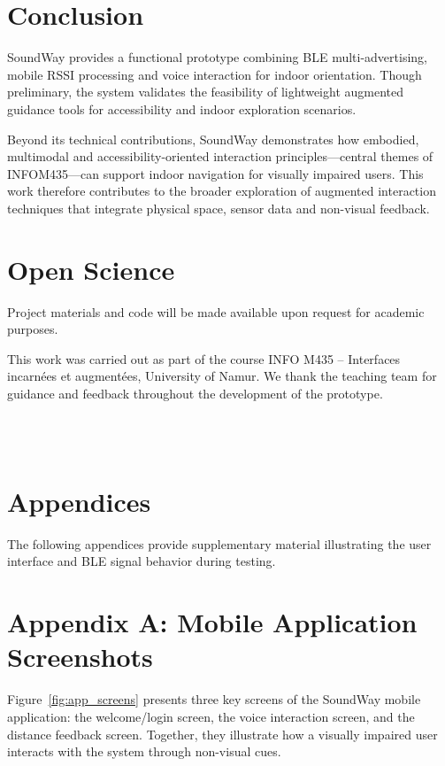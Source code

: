 \documentclass[sigconf]{acmart}
\begin{document}
\section{Conclusion}

SoundWay provides a functional prototype combining BLE multi-advertising, mobile RSSI processing and voice interaction for indoor orientation.  
Though preliminary, the system validates the feasibility of lightweight augmented guidance tools for accessibility and indoor exploration scenarios.

Beyond its technical contributions, SoundWay demonstrates how embodied, multimodal 
and accessibility-oriented interaction principles—central themes of INFOM435—can 
support indoor navigation for visually impaired users. This work therefore contributes 
to the broader exploration of augmented interaction techniques that integrate 
physical space, sensor data and non-visual feedback.


\section*{Open Science}
Project materials and code will be made available upon request for academic purposes.

\begin{acks}
This work was carried out as part of the course INFO M435 -- Interfaces incarnées et augmentées, University of Namur. We thank the teaching team for guidance and feedback throughout the development of the prototype.
\end{acks}
\\\\
\section*{Appendices}
The following appendices provide supplementary material illustrating the user interface and BLE signal behavior during testing.

\section*{Appendix A: Mobile Application Screenshots}

Figure~\ref{fig:app_screens} presents three key screens of the SoundWay mobile application: the welcome/login screen, the voice interaction screen, and the distance feedback screen. Together, they illustrate how a visually impaired user interacts with the system through non-visual cues.
\end{document}
